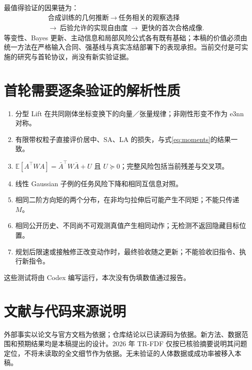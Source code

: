 \documentclass[UTF8,fontset=fandol,11pt,a4paper]{ctexart}
\theoremstyle{plain}
\theoremstyle{definition}
\theoremstyle{remark}
\numberwithin{equation}{section}
\newcommand{\E}{\mathbb E}
\begin{document}
最值得验证的因果链为：
\[
\begin{gathered}
\text{合成训练的几何推断}\ \longrightarrow\ \text{任务相关的观察选择}\\
\longrightarrow\ \text{后验允许的实现自由度}\ \longrightarrow\ \text{更快的首次合格成像}.
\end{gathered}
\]
等变性、Bayes 更新、主动信息和局部风险公式各有既有基础；本稿的价值必须由统一方法在严格输入合同、强基线与真实冻结部署下的表现承担。当前交付是可实施的研究与首轮协议，尚没有新实验证据。

\appendix
\section{首轮需要逐条验证的解析性质}
\begin{enumerate}
\item 分型 Lift 在共同刚体坐标变换下的向量／张量规律；非刚性形变不作为 e3nn 对称。
\item 有限带权粒子直接评价居中、SA、LA 的损失，与式\eqref{eq:moments}的结果一致。
\item $\E[A^\top WA]=\bar A^\top W\bar A+U$ 且 $U\succeq0$；完整风险包括当前残差与交叉项。
\item 线性 Gaussian 子例的任务风险下降和相同互信息对照。
\item 相同二阶方向矩的两个分布，在非均匀拉伸后可能产生不同矩；不能只传递 $M$。
\item 相同公开历史、不同尚不可观测真值产生相同动作；无检测不返回隐藏目标位置。
\item 规划后限速或接触修正改变动作时，最终验收随之更新；不能验收旧指令、执行新指令。
\end{enumerate}
这些测试将由 Codex 编写运行，本次没有伪填数值通过报告。

\section{文献与代码来源说明}
外部事实以论文与官方文档为依据；仓库结论以已读源码为依据。新方法、数据范围和预期结果均是本稿提出的设计。2026 年 TR-FDF 仅按已核验摘要说明其问题定位，不将未读取的全文细节作为依据。无未验证的人体数据或成功率被移入本稿。
\end{document}

